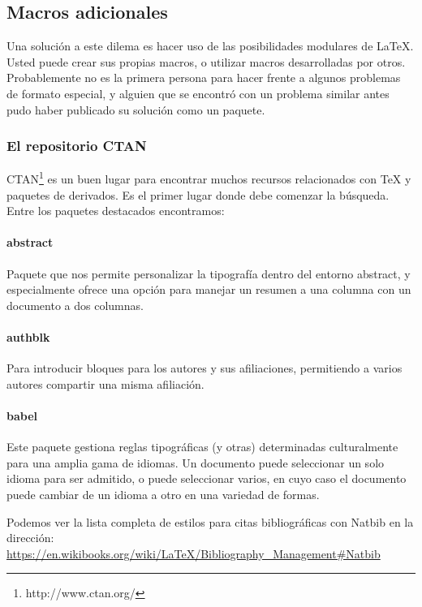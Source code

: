 \documentclass[12pt,letterpaper]{article}
\begin{document}
\subsection{Macros adicionales}

Una solución a este dilema es hacer uso de las posibilidades modulares de LaTeX. Usted puede crear sus propias macros, o utilizar macros desarrolladas por otros. Probablemente no es la primera persona para hacer frente a algunos problemas de formato especial, y alguien que se encontró con un problema similar antes pudo haber publicado su solución como un paquete.

\subsubsection{El repositorio CTAN}

CTAN\footnote{http://www.ctan.org/} es un buen lugar para encontrar muchos recursos relacionados con TeX y paquetes de derivados. Es el primer lugar donde debe comenzar la búsqueda. Entre los paquetes destacados encontramos:

\paragraph{abstract} Paquete que nos permite personalizar la tipografía dentro del entorno abstract, y especialmente ofrece una opción para manejar un resumen a una columna con un documento a dos columnas.

\paragraph{authblk} Para introducir bloques para los autores y sus afiliaciones, permitiendo a varios autores compartir una misma afiliación.

\paragraph{babel} Este paquete gestiona reglas tipográficas (y otras) determinadas culturalmente para una amplia gama de idiomas. Un documento puede seleccionar un solo idioma para ser admitido, o puede seleccionar varios, en cuyo caso el documento puede cambiar de un idioma a otro en una variedad de formas.




\vspace{0.5cm}
Podemos ver la lista completa de estilos para citas bibliográficas con Natbib en la dirección: \url{https://en.wikibooks.org/wiki/LaTeX/Bibliography_Management#Natbib}
\end{document}
